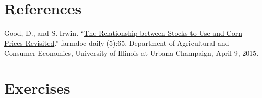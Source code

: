\documentclass[
  letterpaper,
  DIV=11,
  numbers=noendperiod]{scrreprt}
\begin{document}
\hypertarget{references}{%
\section{References}\label{references}}

Good, D., and S. Irwin.
``\href{http://farmdocdaily.illinois.edu/2015/04/relationship-stock-to-use-and-corn-prices.html}{The
Relationship between Stocks-to-Use and Corn Prices Revisited}.'' farmdoc
daily (5):65, Department of Agricultural and Consumer Economics,
University of Illinois at Urbana-Champaign, April 9, 2015.

\hypertarget{exercises-4}{%
\section{Exercises}\label{exercises-4}}
\end{document}
